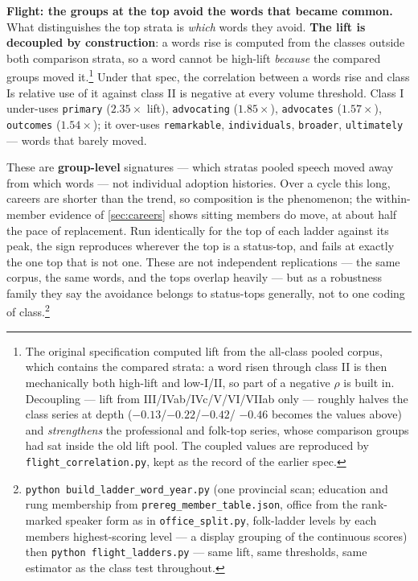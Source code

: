 \textbf{Flight: the groups at the top avoid the words that became common.}
What distinguishes the top strata is \emph{which} words they avoid. \textbf{The lift is
decoupled by construction}: a word\textquotesingle s rise is computed from the classes
outside both comparison strata, so a word cannot be high-lift \emph{because} the
compared groups moved it.\footnote{The original specification computed lift from the all-class
  pooled corpus, which contains the compared strata: a word risen through
  class II is then mechanically both high-lift and low-I/II, so part of a
  negative \(\rho\) is built in. Decoupling --- lift from III/IVab/IVc/V/VI/VIIab
  only --- roughly halves the class series at depth (\(-0.13\)/\(-0.22\)/\(-0.42\)/
  \(-0.46\) becomes the values above) and \emph{strengthens} the professional and
  folk-top series, whose comparison groups had sat inside the old lift
  pool. The coupled values are reproduced by \texttt{flight\_correlation.py},
  kept as the record of the earlier spec.} Under that spec, the correlation
between a word\textquotesingle s rise and class I\textquotesingle s relative use of it against class II is
negative at every volume threshold. Class I under-uses \texttt{primary} (\(2.35\times\)
lift), \texttt{advocating} (\(1.85\times\)), \texttt{advocates} (\(1.57\times\)), \texttt{outcomes} (\(1.54\times\)); it
over-uses \texttt{remarkable}, \texttt{individuals}, \texttt{broader}, \texttt{ultimately} --- words that
barely moved.

These are \textbf{group-level} signatures --- which strata\textquotesingle s pooled speech moved
away from which words --- not individual adoption histories. Over a cycle this
long, careers are shorter than the trend, so composition is the phenomenon;
the within-member evidence of \cref{sec:careers} shows sitting members do move, at about
half the pace of replacement. Run identically for the top of each ladder
against its peak, the sign reproduces wherever the top is a status-top, and
fails at exactly the one top that is not one. These are not independent
replications --- the same corpus, the same words, and the tops overlap heavily
--- but as a robustness family they say the avoidance belongs to status-tops
generally, not to one coding of class.\footnote{\texttt{python\ build\_\allowbreak{}ladder\_\allowbreak{}word\_\allowbreak{}year.\allowbreak{}py} (one provincial scan;
  education and rung membership from \texttt{prereg\_\allowbreak{}member\_\allowbreak{}table.\allowbreak{}json}, office
  from the rank-marked speaker form as in \texttt{office\_split.py}, folk-ladder
  levels by each member\textquotesingle s highest-scoring level --- a display grouping of
  the continuous scores) then \texttt{python\ flight\_\allowbreak{}ladders.\allowbreak{}py} --- same lift,
  same thresholds, same estimator as the class test throughout.}

